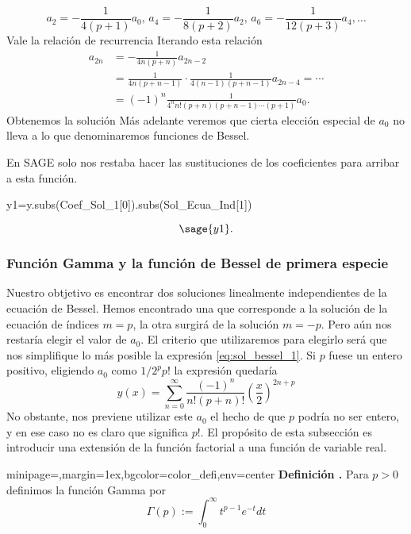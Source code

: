 \documentclass{article}
\newenvironment{colbox}[2]{%
    \begin{adjustbox}{minipage={\linewidth},margin=1ex,bgcolor=#1,env=center}
        #2}{%
    \end{adjustbox}%
}
\newcounter{defi_cont}
\newenvironment{definicion}[1]{\begin{colbox}{color_defi}{\refstepcounter{defi_cont}\textbf{Definición \arabic{defi_cont}.} #1}}{\end{colbox}}
\newcounter{cor_cont}
\renewcommand{\emph}[1]{\textcolor[rgb]{0,0,1}{#1}}
\begin{document}
\[a_2=-\frac{1}{4(p+1)}a_0,\,a_4=-\frac{1}{8(p+2)}a_2,\,a_6=-\frac{1}{12(p+3)}a_4,\ldots\]
Vale la relación de recurrencia
Iterando esta relación
\[
\begin{split}
  a_{2n}&=-\frac{1}{4n(p+n)}a_{2n-2}\\
       &=\frac{1}{4n(p+n-1)}\cdot\frac{1}{4(n-1)(p+n-1)}a_{2n-4}=\cdots\\
       & =(-1)^n\frac{1}{4^nn!(p+n)(p+n-1)\cdots (p+1)}a_{0}.
\end{split}
\]
Obtenemos la solución 
Más adelante veremos que cierta elección especial de $a_0$ no lleva a lo que denominaremos funciones de Bessel.

En SAGE solo nos restaba hacer las sustituciones de los coeficientes para arribar a esta función.
\begin{sageblock}
y1=y.subs(Coef_Sol_1[0]).subs(Sol_Ecua_Ind[1])
\end{sageblock}

\[\sage{y1}.\]

\subsubsection{Función Gamma y la función de Bessel de primera especie}

Nuestro obtjetivo es encontrar dos soluciones linealmente independientes de la ecuación de Bessel. Hemos encontrado una que corresponde a la solución de la ecuación de índices $m=p$, la otra surgirá de la solución $m=-p$. Pero aún nos restaría elegir el valor de $a_0$. El criterio que utilizaremos para elegirlo será que nos simplifique lo más posible la expresión  \eqref{eq:sol_bessel_1}. Si $p$ fuese un entero positivo, eligiendo $a_0$ como $1/2^pp!$ la expresión quedaría
\[y(x)=\sum_{n=0}^{\infty}\frac{(-1)^n}{n!(p+n)!}\left(\frac{x}{2}\right)^{2n+p}\]
No obstante, nos previene utilizar este $a_0$ el hecho de que $p$ podría no ser entero, y en ese caso no es claro que significa $p!$. El propósito de esta subsección es introducir una extensión de la función factorial a una función de variable real. 

\begin{definicion}\label{def:gamma} Para $p>0$ definimos la \emph{función Gamma} por 
\begin{equation}\label{eq:gamma}\Gamma(p):=\int_0^{\infty}t^{p-1}e^{-t}dt
\end{equation}
\end{definicion}
\end{document}
